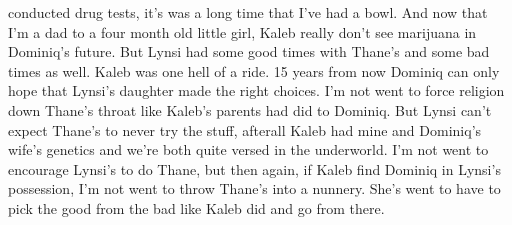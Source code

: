 \documentclass[12pt]{book}
\begin{document}
conducted drug tests, it's was a long time that I've had a bowl. And now that I'm a dad to a four month old little girl, Kaleb really don't see marijuana in Dominiq's future. But Lynsi had some good times with Thane's and some bad times as well. Kaleb was one hell of a ride. 15 years from now Dominiq can only hope that Lynsi's daughter made the right choices. I'm not went to force religion down Thane's throat like Kaleb's parents had did to Dominiq. But Lynsi can't expect Thane's to never try the stuff, afterall Kaleb had mine and Dominiq's wife's genetics and we're both quite versed in the underworld. I'm not went to encourage Lynsi's to do Thane, but then again, if Kaleb find Dominiq in Lynsi's possession, I'm not went to throw Thane's into a nunnery. She's went to have to pick the good from the bad like Kaleb did and go from there.
\end{document}

